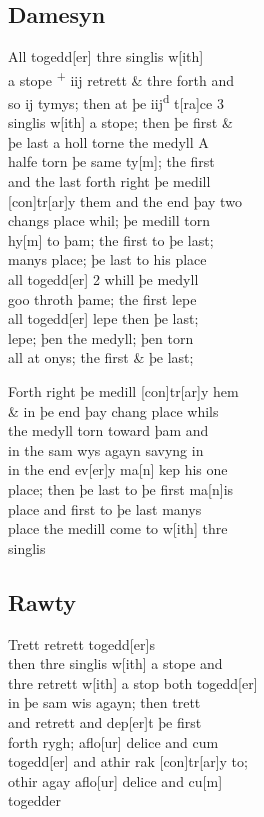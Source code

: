 \documentclass[12pt,letter]{article} %
\newcommand{\srcpg}[1]{
    \noindent{
        \color{Gray}{\rule[0.5ex]{\linewidth}{1pt}~#1} 
    
    }
}
\begin{document}
\subsection{Damesyn}
All togedd{[}er{]} thre singlis w{[}ith{]}\\
a stope \textsuperscript{+} iij retrett \& thre forth and\\
so ij tymys; then at þe \reversemarginpar{}iij\textsuperscript{d} t{[}ra{]}ce 3\\
singlis w{[}ith{]} a stope; then þe first \&\\
þe last a holl torne the medyll A\\
halfe torn þe same ty{[}m{]}; the first\\
and the last forth right þe medill\\
{[}con{]}tr{[}ar{]}y them and the end þay two\\
changs place whil; þe medill torn\\
hy{[}m{]} to þam; the first to þe last;\\
manys place; þe last to his place\\
all togedd{[}er{]} 2 whill þe medyll\\
goo throth þame; the first lepe\\
all togedd{[}er{]} lepe then þe last;\\
lepe; þen the medyll; þen torn\\
all at onys; the first \& þe last; 
\srcpg{69} 
Forth right þe medill {[}con{]}tr{[}ar{]}y hem\\
\& in þe end þay chang place whils\\
the medyll torn toward þam and\\
in the sam wys agayn savyng in\\
in the end ev{[}er{]}y ma{[}n{]} kep his one\\
place; then þe last to þe first ma{[}n{]}is\\
place and first to þe last manys\\
place the medill come to w{[}ith{]} thre\\
singlis

\subsection{Rawty}
Trett retrett togedd{[}er{]}s\\
then thre singlis w{[}ith{]} a stope and\\
thre retrett w{[}ith{]} a stop both togedd{[}er{]}\\
in þe sam wis agayn; then trett\\
and retrett and dep{[}er{]}t þe first\\
forth rygh; aflo{[}ur{]} delice and cum\\
togedd{[}er{]} and athir rak {[}con{]}tr{[}ar{]}y to;\\
othir agay aflo{[}ur{]} delice and cu{[}m{]}\\
togedder
\end{document}
